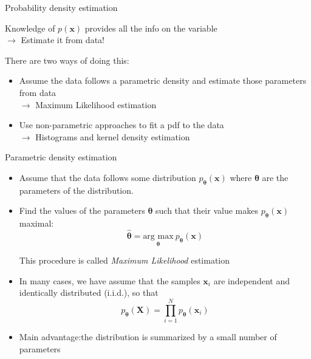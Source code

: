 \documentclass{beamer}
\begin{document}
\begin{frame}{Probability density estimation}

Knowledge of $p(\mathbf{x})$ provides all the info on the variable\\
$\rightarrow$ Estimate it from data!\\

\vspace{0.2cm}

There are two ways of doing this:
\begin{itemize}
\item Assume the data follows a parametric density and estimate those parameters from data\\
$\rightarrow$ Maximum Likelihood estimation
\item Use non-parametric approaches to fit a pdf to the data\\
$\rightarrow$ Histograms and kernel density estimation
\end{itemize}



\end{frame}

\begin{frame}{Parametric density estimation}
\begin{itemize}
\item Assume that the data follows some distribution $p_{\boldsymbol{\theta}}(\mathbf{x})$ where $\boldsymbol{\theta}$ are the parameters of the distribution.
\item Find the values of the parameters $\boldsymbol{\theta}$ such that their value makes $p_{\boldsymbol{\theta}}(\mathbf{x})$ maximal:\\
\begin{equation*}
\hat{\boldsymbol{\theta}} = \underset{\boldsymbol{\theta}}{\textrm{arg max}} \ p_{\boldsymbol{\theta}}(\mathbf{x})
\end{equation*}

This procedure is called \emph{Maximum Likelihood} estimation

\item

In many cases, we have assume that the samples $\mathbf{x}_{i}$ are independent and identically distributed (i.i.d.), so that\\

\begin{equation*}
p_{\boldsymbol{\theta}}(\mathbf{X}) = \prod_{i=1}^{N}  p_{\boldsymbol{\theta}}(\mathbf{x}_{i})
\end{equation*}

\item Main advantage:the distribution is summarized by a small number of parameters

\end{itemize}
\end{frame}
\end{document}
